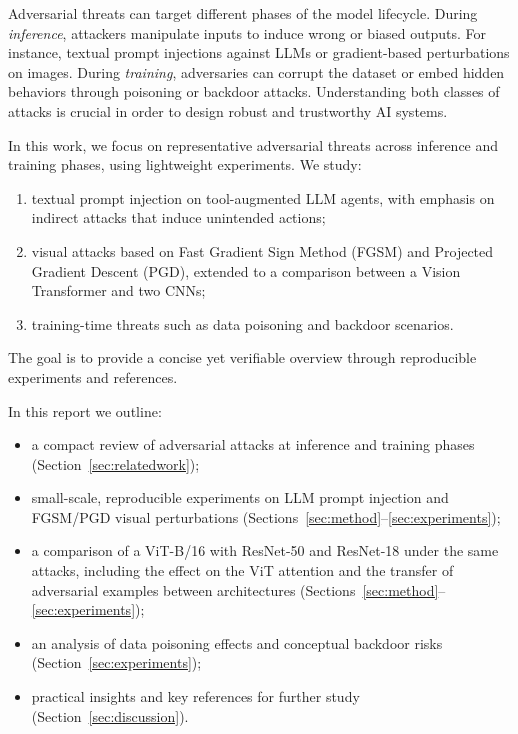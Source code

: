 \documentclass{article}
\begin{document}
Adversarial threats can target different phases of the model lifecycle. During \textit{inference}, attackers manipulate inputs to induce wrong or biased outputs. For instance, textual prompt injections against LLMs or gradient-based perturbations on images. During \textit{training}, adversaries can corrupt the dataset or embed hidden behaviors through poisoning or backdoor attacks. Understanding both classes of attacks is crucial in order to design robust and trustworthy AI systems.

In this work, we focus on representative adversarial threats across inference and training phases, using lightweight experiments. We study:
\begin{enumerate}[noitemsep, topsep=2pt, parsep=0pt, partopsep=0pt, leftmargin=*]
  \item textual prompt injection on tool-augmented LLM agents, with emphasis on indirect attacks that induce unintended actions;
  \item visual attacks based on Fast Gradient Sign Method (FGSM) and Projected Gradient Descent (PGD), extended to a comparison between a Vision Transformer and two CNNs;
  \item training-time threats such as data poisoning and backdoor scenarios.
\end{enumerate}
The goal is to provide a concise yet verifiable overview through reproducible experiments and references.

In this report we outline:
\begin{itemize}[noitemsep, topsep=2pt, parsep=0pt, partopsep=0pt, leftmargin=*]
  \item a compact review of adversarial attacks at inference and training phases (Section~\ref{sec:relatedwork});
  \item small-scale, reproducible experiments on LLM prompt injection and FGSM/PGD visual perturbations (Sections~\ref{sec:method}--\ref{sec:experiments});
  \item a comparison of a ViT-B/16 with ResNet-50 and ResNet-18 under the same attacks, including the effect on the ViT attention and the transfer of adversarial examples between architectures (Sections~\ref{sec:method}--\ref{sec:experiments});
  \item an analysis of data poisoning effects and conceptual backdoor risks (Section~\ref{sec:experiments});
  \item practical insights and key references for further study (Section~\ref{sec:discussion}).
\end{itemize}
\end{document}
